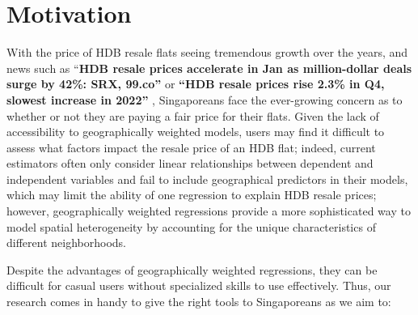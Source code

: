 \documentclass[manuscript,screen]{acmart}
\begin{document}
\maketitle

\setlength{\parskip}{-0.1pt}

\hypertarget{motivation}{%
\section{Motivation}\label{motivation}}

With the price of HDB resale flats seeing tremendous growth over the
years, and news such as ``\textbf{HDB resale prices accelerate in Jan as
million-dollar deals surge by 42\%: SRX, 99.co''} \citep{Yong23} or
\textbf{``HDB resale prices rise 2.3\% in Q4, slowest increase in
2022''} \citep{Liew23}, Singaporeans face the ever-growing concern as to
whether or not they are paying a fair price for their flats. Given the
lack of accessibility to geographically weighted models, users may find
it difficult to assess what factors impact the resale price of an HDB
flat; indeed, current estimators often only consider linear
relationships between dependent and independent variables and fail to
include geographical predictors in their models, which may limit the
ability of one regression to explain HDB resale prices; however,
geographically weighted regressions provide a more sophisticated way to
model spatial heterogeneity by accounting for the unique characteristics
of different neighborhoods.

Despite the advantages of geographically weighted regressions, they can
be difficult for casual users without specialized skills to use
effectively. Thus, our research comes in handy to give the right tools
to Singaporeans as we aim to:
\end{document}
